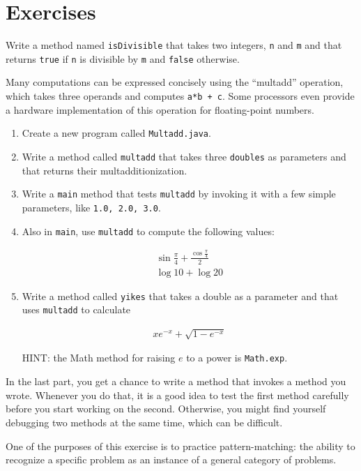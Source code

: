 \section{Exercises}

\begin{exercise}
\label{ex.isdiv}

Write a method named {\tt isDivisible} that takes
two integers, {\tt n} and {\tt m} and that returns {\tt true}
if {\tt n} is divisible by {\tt m} and {\tt false} otherwise.

\end{exercise}


\begin{exercise}
\label{ex.multadd}

Many computations can be expressed concisely using the ``multadd''
operation, which takes three operands and computes {\tt a*b + c}.  Some
processors even provide a hardware implementation of this operation for
floating-point numbers.

\begin{enumerate}

\item Create a new program called {\tt Multadd.java}.

\item Write a method called {\tt multadd} that takes three {\tt doubles}
as parameters and that returns their multadditionization.

\item Write a {\tt main} method that tests {\tt multadd} by invoking it with a
few simple parameters, like {\tt 1.0, 2.0, 3.0}.

\item Also in {\tt main}, use {\tt multadd} to compute the
following values:

\begin{eqnarray*}
& \sin \frac{\pi}{4} + \frac{\cos \frac{\pi}{4}}{2} & \\
& \log 10 + \log 20 &
\end{eqnarray*}

\item Write a method called {\tt yikes} that takes a
double as a parameter and that uses {\tt multadd} to calculate

\begin{eqnarray*}
x e^{-x} + \sqrt{1 - e^{-x}}
\end{eqnarray*}

HINT: the Math method for raising $e$ to a power is {\tt Math.exp}.

\end{enumerate}

In the last part, you get a chance to write a method that invokes
a method you wrote.  Whenever you do that, it is a good idea to
test the first method carefully before you start working on the
second.  Otherwise, you might find yourself debugging two methods
at the same time, which can be difficult.

One of the purposes of this exercise is to practice pattern-matching:
the ability to recognize a specific problem as an instance of a
general category of problems.

\end{exercise}



